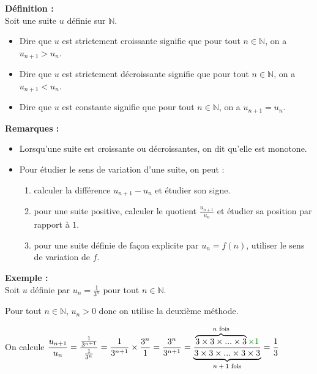 \documentclass[11pt,a4paper]{article}
\begin{document}
\begin{mdframed}[style=definitionStyle]
    \textbf{Définition :} ~\\
    Soit une suite $u$ définie sur $\mathbb{N}$.
    \vspace{-4pt}
    \begin{itemize}
      \item Dire que $u$ est strictement croissante signifie que pour tout $n\in\mathbb{N}$, on a $u_{n+1}>u_n$.
      \item Dire que $u$ est strictement décroissante signifie que pour tout $n\in\mathbb{N}$, on a $u_{n+1}<u_n$.
      \item Dire que $u$ est constante signifie que pour tout $n\in\mathbb{N}$, on a $u_{n+1}=u_n$.
    \end{itemize}

\end{mdframed}

\textbf{Remarques :}
\begin{itemize}
  \item Lorsqu'une suite est croissante ou décroissantes, on dit qu'elle est monotone. 
  \item Pour étudier le sens de variation d'une suite, on peut :
  \vspace{-4pt}
  \begin{enumerate}
    \item calculer la différence $u_{n+1}-u_n$ et étudier son signe.
    \item pour une suite positive, calculer le quotient $\displaystyle\frac{u_{n+1}}{u_n}$ et étudier sa position par rapport à $1$.
    \item pour une suite définie de façon explicite par $u_n=f(n)$, utiliser le sens de variation de $f$. \\
  \end{enumerate}
\end{itemize}
\textbf{Exemple :} ~\\
Soit $u$ définie par $u_n=\frac{1}{3^n}$ pour tout $n\in\mathbb{N}$.

Pour tout $n\in\mathbb{N}$, $u_n>0$ donc on utilise la deuxième méthode.

On calcule $\displaystyle\frac{u_{n+1}}{u_n}=\frac{\frac{1}{3^{n+1}}}{\frac{1}{3^n}}=\frac{1}{3^{n+1}}\times\frac{3^n}{1}=\frac{3^n}{3^{n+1}}=\underbrace{\frac{\overbrace{3\times3\times...\times3}^{\text{$n$ fois}}\color{dark_green}\times1}{3\times3\times...\times3\times3}}_{\text{$n+1$ fois}}=\frac{1}{3}$
\end{document}
